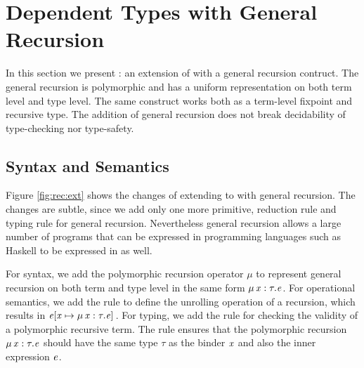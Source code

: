 \newcommand{\newsyntax}{
\ottrulehead{\ottnt{e}  ,\ \tau,\
\sigma}{::=}{\ottcom{Expressions}}\ottprodnewline
\ottfirstprodline{|}{\dots}{}{}{}{}\ottprodnewline
\ottprodline{|}{\mu \, \ottmv{x}  \ottsym{:}  \tau  \ottsym{.}  \ottnt{e}}{}{}{}{\ottcom{Polymorphic recursion}}}

\section{Dependent Types with General Recursion}\label{sec:rec}

In this section we present \name: an extension of \ecore with a
general recursion contruct.  The general recursion is polymorphic and
has a uniform representation on both term level and type level. The
same construct works both as a term-level fixpoint and recursive type.
The addition of general recursion does not break decidability of
type-checking nor type-safety.


\subsection{Syntax and Semantics}

Figure \ref{fig:rec:ext} shows the changes of extending \ecore to
\name with general recursion. The changes are subtle, since we add
only one more primitive, reduction rule and typing rule for general
recursion. Nevertheless general recursion allows a large number 
of programs that can be expressed in programming languages such 
as Haskell to be expressed in \name as well.

For syntax, we add the polymorphic recursion operator $ \mu $ to
represent general recursion on both term and type level in the same
form $\mu \, \mathit{x}  :  \tau  .  \mathit{e}$. For operational semantics, we add the rule
\ruleref{S\_Mu} to define the unrolling operation of a recursion,
which results in $\mathit{e}  [  \mathit{x}  \mapsto  \mu \, \mathit{x}  :  \tau  .  \mathit{e}  ] \,$. For typing, we add the
rule \ruleref{T\_Mu} for checking the validity of a polymorphic
recursive term. The rule ensures that the polymorphic recursion $\mu \, \mathit{x}  :  \tau  .  \mathit{e}$ should have the same type $\tau$ as the binder $\mathit{x}$
and also the inner expression $\mathit{e}$.

